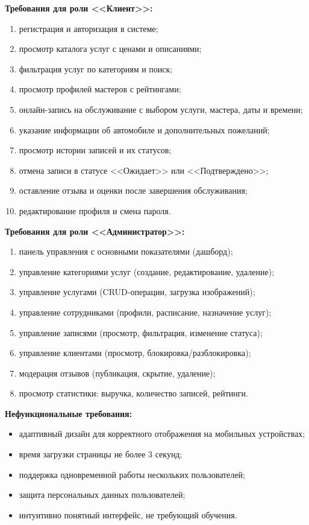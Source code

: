 \documentclass[14pt,a4paper,oneside]{extarticle}
\begin{document}
\textbf{Требования для роли <<Клиент>>:}
\begin{enumerate}[leftmargin=2cm]
    \item регистрация и авторизация в системе;
    \item просмотр каталога услуг с ценами и описаниями;
    \item фильтрация услуг по категориям и поиск;
    \item просмотр профилей мастеров с рейтингами;
    \item онлайн-запись на обслуживание с выбором услуги, мастера, даты и времени;
    \item указание информации об автомобиле и дополнительных пожеланий;
    \item просмотр истории записей и их статусов;
    \item отмена записи в статусе <<Ожидает>> или <<Подтверждено>>;
    \item оставление отзыва и оценки после завершения обслуживания;
    \item редактирование профиля и смена пароля.
\end{enumerate}

\textbf{Требования для роли <<Администратор>>:}
\begin{enumerate}[leftmargin=2cm]
    \item панель управления с основными показателями (дашборд);
    \item управление категориями услуг (создание, редактирование, удаление);
    \item управление услугами (CRUD-операции, загрузка изображений);
    \item управление сотрудниками (профили, расписание, назначение услуг);
    \item управление записями (просмотр, фильтрация, изменение статуса);
    \item управление клиентами (просмотр, блокировка/разблокировка);
    \item модерация отзывов (публикация, скрытие, удаление);
    \item просмотр статистики: выручка, количество записей, рейтинги.
\end{enumerate}

\textbf{Нефункциональные требования:}
\begin{itemize}[leftmargin=2cm]
    \item адаптивный дизайн для корректного отображения на мобильных устройствах;
    \item время загрузки страницы не более 3 секунд;
    \item поддержка одновременной работы нескольких пользователей;
    \item защита персональных данных пользователей;
    \item интуитивно понятный интерфейс, не требующий обучения.
\end{itemize}
\end{document}
